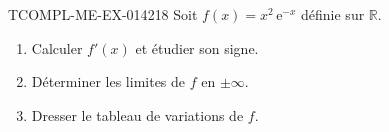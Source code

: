 \begin{exercice}{TCOMPL-ME-EX-014}{2}{18}
Soit $f(x) = x^2\,\mathrm{e}^{-x}$ définie sur $\mathbb{R}$.
\begin{enumerate}
  \item Calculer $f'(x)$ et étudier son signe.
  \item Déterminer les limites de $f$ en $\pm\infty$.
  \item Dresser le tableau de variations de $f$.
\end{enumerate}

\end{exercice}

